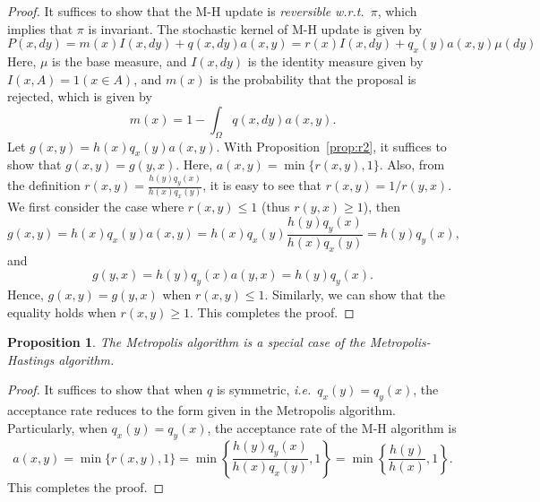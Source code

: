 \documentclass[a4paper,11pt]{article}
\newtheorem{proposition}{Proposition}
\begin{document}
\begin{proof}
    It suffices to show that the M-H update is \emph{reversible} \emph{w.r.t.}~$\pi$, which implies that $\pi$ is invariant.
    The stochastic kernel of M-H update is given by
    \begin{equation}
        P(x, dy) = m(x) I(x, dy) + q(x, dy) a(x, y) = r(x) I(x, dy) + q_x(y) a(x, y) \mu(dy)
    \end{equation}
    Here, $\mu$ is the base measure, and $I(x, dy)$ is the identity measure given by $I(x, A) = 1(x \in A)$, and $m(x)$ is the probability that the proposal is rejected, which is given by
    \begin{equation}
        m(x) = 1 - \int_\Omega q(x, dy) a(x, y). 
    \end{equation}
    Let $g(x, y) = h(x) q_x(y) a(x, y)$. With Proposition~\ref{prop:r2}, it suffices to show that $g(x, y) = g(y, x)$. 
    Here, $a(x, y) = \min\{r(x, y), 1\}$. Also, from the definition $r(x, y) = \frac{h(y) q_y(x)}{h(x) q_x(y)}$, it is easy to see that $r(x, y) = 1 / r(y, x)$. 
    We first consider the case where $r(x, y) \le 1$ (thus $r(y, x) \ge 1$), then 
    \begin{equation}
        g(x, y) 
        = h(x) q_x(y) a(x, y) 
        = h(x) q_x(y) \frac{h(y) q_y(x)}{h(x) q_x(y)}
        = h(y) q_y(x),
    \end{equation}
    and
    \begin{equation}
        g(y, x) = h(y) q_y(x) a(y, x) = h(y) q_y(x).
    \end{equation}
    Hence, $g(x, y) = g(y, x)$ when $r(x, y) \le 1$. Similarly, we can show that the equality holds when $r(x, y) \ge 1$. 
    This completes the proof.
\end{proof}

\begin{proposition}
    The Metropolis algorithm is a special case of the Metropolis-Hastings algorithm.
\end{proposition}

\begin{proof}
    It suffices to show that when $q$ is symmetric, \textit{i.e.}~$q_x(y) = q_y(x)$, the acceptance rate reduces to the form given in the Metropolis algorithm.
    Particularly, when $q_x(y) = q_y(x)$, the acceptance rate of the M-H algorithm is 
    \begin{equation}
        a(x, y) = \min \{ r(x, y), 1 \} 
        = \min \left\{ \frac{h(y) q_y(x)}{h(x) q_x(y)}, 1\right\} = \min \left\{ \frac{h(y)}{h(x)}, 1\right\}.
    \end{equation}
    This completes the proof.
\end{proof}
\end{document}
